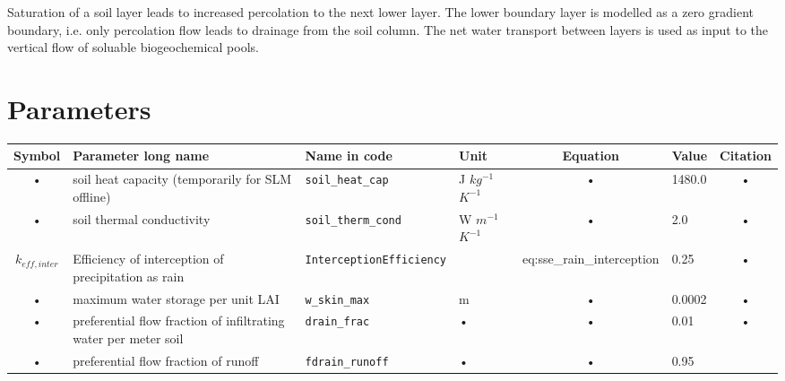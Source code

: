 Saturation of a soil layer leads to increased percolation to the next lower layer. The lower boundary layer is modelled as a zero gradient boundary, i.e. only percolation flow leads to drainage from the soil column. The net water transport between layers is used as input to the vertical flow of soluable biogeochemical pools.



\begin{table}
\section{Parameters}\label{tab:sse:param}

\begin{tabularx}{\linewidth}{|c|X|l|l|c|l|c|} %
\hline 
Symbol & Parameter long name & Name in code & Unit & Equation & Value & Citation \\ 
\hline
• & soil heat capacity (temporarily for SLM offline) & \texttt{soil\_heat\_cap} & J $kg^{-1}$ $K^{-1}$ & • & 1480.0 & • \\
• & soil thermal conductivity & \texttt{soil\_therm\_cond} & W $m^{-1}$ $K^{-1}$ & • & 2.0 & • \\
$k_{eff,inter}$ & Efficiency of interception of precipitation as rain & \texttt{InterceptionEfficiency} &  & eq:sse\_rain\_interception & 0.25 & • \\
• & maximum water storage per unit LAI & \texttt{w\_skin\_max} & m & • & 0.0002 & • \\
• & preferential flow fraction of infiltrating water per meter soil & \texttt{drain\_frac} & • & • & 0.01 & • \\
• & preferential flow fraction of runoff & \texttt{fdrain\_runoff} & • & • & 0.95 & \cite{krinneral05} \\
\hline
\end{tabularx}
\end{table}






\pagebreak

\newpage
